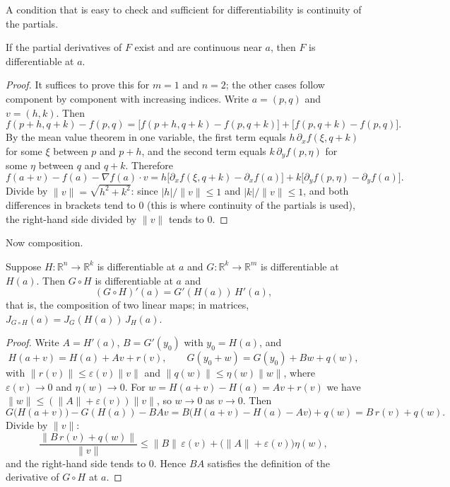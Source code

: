 A condition that is easy to check and sufficient for differentiability is continuity of the
partials.

\begin{teorema}
If the partial derivatives of $F$ exist and are continuous near $a$, then $F$ is
differentiable at $a$.
\end{teorema}

\begin{proof}
It suffices to prove this for $m=1$ and $n=2$; the other cases follow component by component
with increasing indices. Write $a=(p,q)$ and $v=(h,k)$. Then
\[
  f(p+h,q+k)-f(p,q)
  =\bigl[f(p+h,q+k)-f(p,q+k)\bigr]+\bigl[f(p,q+k)-f(p,q)\bigr].
\]
By the mean value theorem in one variable, the first term equals
$h\,\partial_{x}f(\xi,q+k)$ for some $\xi$ between $p$ and $p+h$, and the second term equals
$k\,\partial_{y}f(p,\eta)$ for some $\eta$ between $q$ and $q+k$. Therefore
\[
  f(a+v)-f(a)-\nabla f(a)\cdot v
  =h\bigl[\partial_{x}f(\xi,q+k)-\partial_{x}f(a)\bigr]
  +k\bigl[\partial_{y}f(p,\eta)-\partial_{y}f(a)\bigr].
\]
Divide by $\|v\|=\sqrt{h^{2}+k^{2}}$: since $|h|/\|v\|\le1$ and $|k|/\|v\|\le1$, and both
differences in brackets tend to $0$ (this is where continuity of the partials is used), the
right-hand side divided by $\|v\|$ tends to $0$.
\end{proof}

Now composition.

\begin{teorema}
Suppose $H\colon\mathbb{R}^{n}\to\mathbb{R}^{k}$ is differentiable at $a$ and
$G\colon\mathbb{R}^{k}\to\mathbb{R}^{m}$ is differentiable at $H(a)$. Then $G\circ H$
is differentiable at $a$ and
\[
  (G\circ H)'(a)=G'(H(a))\,H'(a),
\]
that is, the composition of two linear maps; in matrices,
$J_{G\circ H}(a)=J_{G}(H(a))\,J_{H}(a)$.
\end{teorema}

\begin{proof}
Write $A=H'(a)$, $B=G'(y_{0})$ with $y_{0}=H(a)$, and
\[
  H(a+v)=H(a)+Av+r(v),\qquad G(y_{0}+w)=G(y_{0})+Bw+q(w),
\]
with $\|r(v)\|\le\varepsilon(v)\|v\|$ and $\|q(w)\|\le\eta(w)\|w\|$, where
$\varepsilon(v)\to0$ and $\eta(w)\to0$. For $w=H(a+v)-H(a)=Av+r(v)$ we have
$\|w\|\le(\|A\|+\varepsilon(v))\|v\|$, so $w\to0$ as $v\to0$. Then
\[
  G\bigl(H(a+v)\bigr)-G(H(a))-BAv
  =B\bigl(H(a+v)-H(a)-Av\bigr)+q(w)
  =B\,r(v)+q(w).
\]
Divide by $\|v\|$:
\[
  \frac{\|B\,r(v)+q(w)\|}{\|v\|}
  \le\|B\|\,\varepsilon(v)+\bigl(\|A\|+\varepsilon(v)\bigr)\eta(w),
\]
and the right-hand side tends to $0$. Hence $BA$ satisfies the definition of the derivative of
$G\circ H$ at $a$.
\end{proof}

